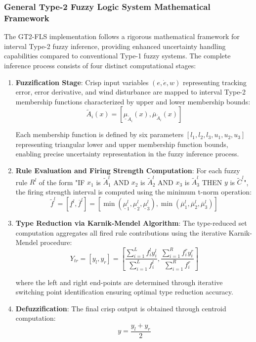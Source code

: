\subsubsection*{General Type-2 Fuzzy Logic System Mathematical Framework}

The GT2-FLS implementation follows a rigorous mathematical framework for interval Type-2 fuzzy inference, providing enhanced uncertainty handling capabilities compared to conventional Type-1 fuzzy systems. The complete inference process consists of four distinct computational stages:

\begin{enumerate}
    \item \textbf{Fuzzification Stage}: Crisp input variables $(e, \dot{e}, w)$ representing tracking error, error derivative, and wind disturbance are mapped to interval Type-2 membership functions characterized by upper and lower membership bounds:
    \begin{equation}
    \tilde{A}_i(x) = [\underline{\mu}_{\tilde{A}_i}(x), \overline{\mu}_{\tilde{A}_i}(x)]
    \end{equation}

    Each membership function is defined by six parameters $[l_1, l_2, l_3, u_1, u_2, u_3]$ representing triangular lower and upper membership function bounds, enabling precise uncertainty representation in the fuzzy inference process.

    \item \textbf{Rule Evaluation and Firing Strength Computation}: For each fuzzy rule $R^l$ of the form "IF $x_1$ is $\tilde{A}_1^l$ AND $x_2$ is $\tilde{A}_2^l$ AND $x_3$ is $\tilde{A}_3^l$ THEN $y$ is $\tilde{C}^l$", the firing strength interval is computed using the minimum t-norm operation:
    \begin{equation}
    \tilde{f}^l = [\underline{f}^l, \overline{f}^l] = [\min(\underline{\mu}_1^l, \underline{\mu}_2^l, \underline{\mu}_3^l), \min(\overline{\mu}_1^l, \overline{\mu}_2^l, \overline{\mu}_3^l)]
    \end{equation}

    \item \textbf{Type Reduction via Karnik-Mendel Algorithm}: The type-reduced set computation aggregates all fired rule contributions using the iterative Karnik-Mendel procedure:
    \begin{equation}
    Y_{tr} = [y_l, y_r] = \left[\frac{\sum_{i=1}^{L} f_i^l y_i^l}{\sum_{i=1}^{L} f_i^l}, \frac{\sum_{i=1}^{R} f_i^r y_i^r}{\sum_{i=1}^{R} f_i^r}\right]
    \end{equation}

    where the left and right end-points are determined through iterative switching point identification ensuring optimal type reduction accuracy.

    \item \textbf{Defuzzification}: The final crisp output is obtained through centroid computation:
    \begin{equation}
    y = \frac{y_l + y_r}{2}
    \end{equation}
\end{enumerate}

